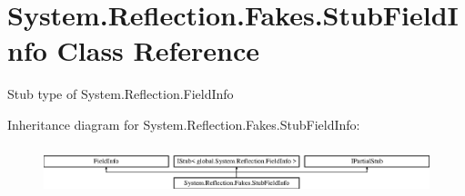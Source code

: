 \hypertarget{class_system_1_1_reflection_1_1_fakes_1_1_stub_field_info}{\section{System.\-Reflection.\-Fakes.\-Stub\-Field\-Info Class Reference}
\label{class_system_1_1_reflection_1_1_fakes_1_1_stub_field_info}
}


Stub type of System.\-Reflection.\-Field\-Info 


Inheritance diagram for System.\-Reflection.\-Fakes.\-Stub\-Field\-Info\-:\begin{figure}[H]
\begin{center}
\leavevmode
\includegraphics[height=1.419518cm]{class_system_1_1_reflection_1_1_fakes_1_1_stub_field_info}
\end{center}
\end{figure}
